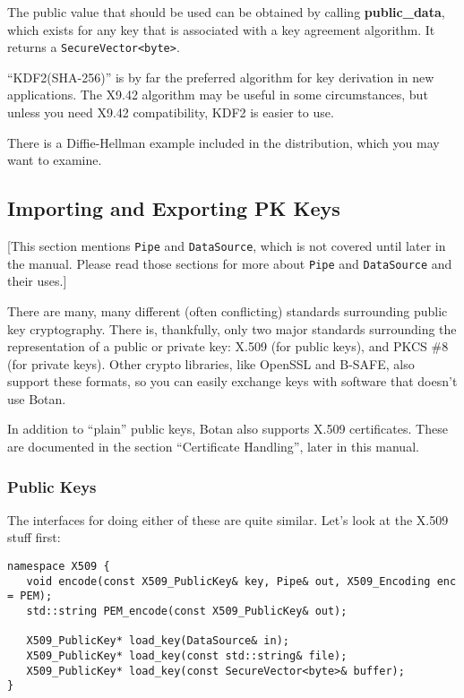 \documentclass{article}
\newcommand{\function}[1]{\textbf{#1}}
\newcommand{\type}[1]{\texttt{#1}}
\begin{document}
The public value that should be used can be obtained by calling
\function{public\_data}, which exists for any key that is associated with a
key agreement algorithm. It returns a \type{SecureVector<byte>}.

``KDF2(SHA-256)'' is by far the preferred algorithm for key derivation
in new applications. The X9.42 algorithm may be useful in some
circumstances, but unless you need X9.42 compatibility, KDF2 is easier
to use.

There is a Diffie-Hellman example included in the distribution, which you may
want to examine.

\subsection{Importing and Exporting PK Keys}

[This section mentions \type{Pipe} and \type{DataSource}, which is not covered
until later in the manual. Please read those sections for more about
\type{Pipe} and \type{DataSource} and their uses.]

There are many, many different (often conflicting) standards surrounding public
key cryptography. There is, thankfully, only two major standards surrounding
the representation of a public or private key: X.509 (for public keys), and
PKCS \#8 (for private keys). Other crypto libraries, like OpenSSL and B-SAFE,
also support these formats, so you can easily exchange keys with software that
doesn't use Botan.

In addition to ``plain'' public keys, Botan also supports X.509 certificates.
These are documented in the section ``Certificate Handling'', later in this
manual.

\subsubsection{Public Keys}

The interfaces for doing either of these are quite similar. Let's look at the
X.509 stuff first:
\begin{verbatim}
namespace X509 {
   void encode(const X509_PublicKey& key, Pipe& out, X509_Encoding enc = PEM);
   std::string PEM_encode(const X509_PublicKey& out);

   X509_PublicKey* load_key(DataSource& in);
   X509_PublicKey* load_key(const std::string& file);
   X509_PublicKey* load_key(const SecureVector<byte>& buffer);
}
\end{verbatim}
\end{document}
